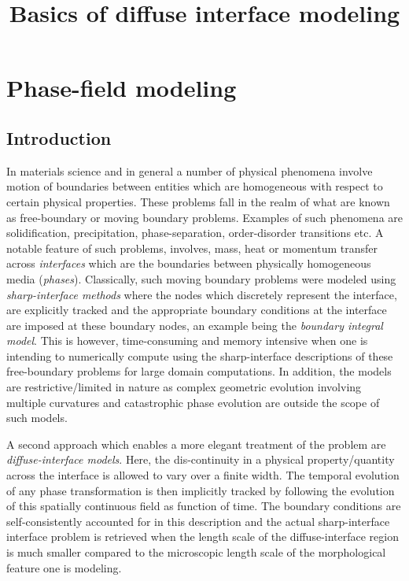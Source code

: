 \documentclass[english]{iambook}
\title{Basics of diffuse interface modeling}
\author{}
\date{}
\begin{document}
\frontmatter
\maketitle
\mainmatter
\chapter{Phase-field modeling}
\section{Introduction}
In materials science and in general a number of physical phenomena
involve motion of boundaries between entities which are homogeneous 
with respect to certain physical properties. These problems fall in 
the realm of what are known as free-boundary or moving 
boundary problems. Examples of such phenomena are solidification, 
precipitation, phase-separation, order-disorder transitions etc.
A notable feature of such problems, involves, mass, heat or momentum 
transfer across \textit{interfaces} which are the boundaries between 
physically homogeneous media (\textit{phases}). Classically, such 
moving boundary problems were modeled using \textit{sharp-interface
methods} where the nodes which discretely represent the interface, 
are explicitly tracked and the appropriate boundary conditions at
the interface are imposed at these boundary nodes, an example being 
the \textit{boundary integral model}. This is however, 
time-consuming and memory intensive when one is intending to numerically
compute using the sharp-interface descriptions of these free-boundary 
problems for large domain computations. In addition, the models are
restrictive/limited in nature as complex geometric evolution involving
multiple curvatures and catastrophic phase evolution are outside the
scope of such models.

A second approach which enables a more elegant treatment of the 
problem are \textit{diffuse-interface models}. Here, the dis-continuity 
in a physical property/quantity across the interface is allowed
to vary over a finite width. The temporal evolution of any phase transformation
is then implicitly tracked by following the evolution of this spatially
continuous field as function of time. The boundary conditions are self-consistently
accounted for in this description and the actual sharp-interface interface
problem is retrieved when the length scale of the diffuse-interface region 
is much smaller compared to the microscopic length scale of the morphological 
feature one is modeling.
\end{document}
